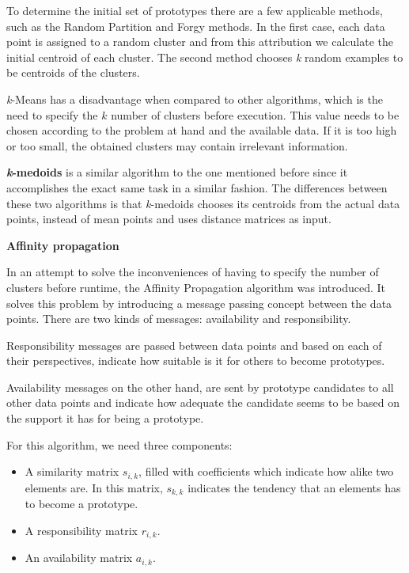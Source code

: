To determine the initial set of prototypes there are a few applicable methods, such as the Random Partition and Forgy methods. In the first case, each data point is assigned to a random cluster and from this attribution we calculate the initial centroid of each cluster. The second method chooses \textit{k} random examples to be centroids of the clusters.

\textit{k}-Means has a disadvantage when compared to other algorithms, which is the need to specify the $k$ number of clusters before execution. This value needs to be chosen according to the problem at hand and the available data. If it is too high or too small, the obtained clusters may contain irrelevant information.

\textbf{\textit{k}-medoids} is a similar algorithm to the one mentioned before since it accomplishes the exact same task in a similar fashion. The differences between these two algorithms is that \textit{k}-medoids chooses its centroids from the actual data points, instead of mean points and uses distance matrices as input. 

\medskip
\textbf{Affinity propagation}

In an attempt to solve the inconveniences of having to specify the number of clusters before runtime, the Affinity Propagation \cite{frey2007clustering} algorithm was introduced. It solves this problem by introducing a message passing concept between the data points. There are two kinds of messages: availability and responsibility. 

Responsibility messages are passed between data points and based on each of their perspectives, indicate how suitable is it for others to become prototypes.  

Availability messages on the other hand, are sent by prototype candidates to all other data points and indicate how adequate the candidate seems to be based on the support it has for being a prototype.

For this algorithm, we need three components:
\begin{itemize}
	\item A similarity matrix $s_{i,k}$, filled with coefficients which indicate how alike two elements are. In this matrix,  $s_{k,k}$ indicates the tendency that an elements has to become a prototype. 
	\item A responsibility matrix $r_{i,k}$.
	\item An availability matrix $a_{i,k}$.
\end{itemize}  

